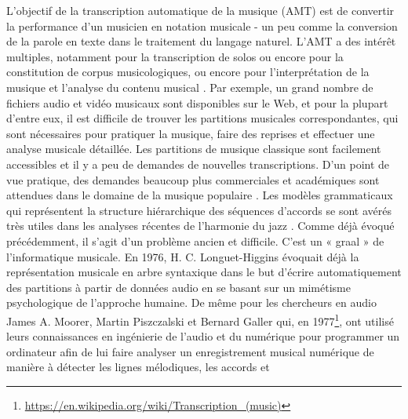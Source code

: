 L'objectif de la transcription automatique de la musique (AMT)
\cite{future_directions} est de convertir la performance d'un musicien en
notation musicale - un peu comme 
la conversion de la parole en texte dans le
traitement du langage naturel. L’AMT a des intérêt  multiples, notamment pour la
transcription de solos 
ou encore pour la constitution de corpus musicologiques,
ou encore pour l'interprétation de la musique et l'analyse du contenu musical
\cite{SHIBATA2021262}. 
Par exemple, un grand nombre de fichiers audio et vidéo
musicaux sont disponibles sur le Web, et pour la plupart d'entre eux, il est
difficile de trouver les partitions musicales correspondantes, qui sont
nécessaires pour pratiquer la musique, faire des reprises et effectuer une
analyse musicale détaillée. Les partitions de musique classique sont facilement
accessibles et il y a peu de demandes de nouvelles transcriptions. 
D'un point
de vue pratique, des demandes beaucoup plus commerciales et académiques sont
attendues dans le domaine de la musique populaire \cite{SHIBATA2021262}. 
Les modèles grammaticaux qui représentent la structure hiérarchique des séquences
d'accords se sont avérés très utiles dans les analyses récentes de l'harmonie
du jazz \cite{harasimjazz}.
Comme déjà évoqué précédemment, il s’agit d’un problème ancien et difficile.
C’est un « graal » de l’informatique musicale. En 1976, H. C. Longuet-Higgins
\cite{first_one} évoquait déjà la représentation musicale en arbre syntaxique
dans le but d’écrire automatiquement des partitions à partir de données audio
en se basant sur un mimétisme psychologique de l’approche humaine. De même pour
les chercheurs en audio James A. Moorer, Martin Piszczalski et Bernard Galler
qui, en 1977\footnote{\url{https://en.wikipedia.org/wiki/Transcription_(music)}}, 
ont utilisé leurs connaissances en ingénierie de l’audio et du numérique
pour programmer un ordinateur afin de lui faire analyser un enregistrement
musical numérique de manière à détecter les lignes mélodiques, les accords et
